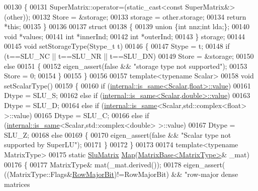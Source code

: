 \begin{DoxyCode}
00130   \{
00131     SuperMatrix::operator=(static\_cast<const SuperMatrix&>(other));
00132     Store = &storage;
00133     storage = other.storage;
00134     \textcolor{keywordflow}{return} *\textcolor{keyword}{this};
00135   \}
00136 
00137   \textcolor{keyword}{struct}
00138   \{
00139     \textcolor{keyword}{union }\{\textcolor{keywordtype}{int} nnz;\textcolor{keywordtype}{int} lda;\};
00140     \textcolor{keywordtype}{void} *values;
00141     \textcolor{keywordtype}{int} *innerInd;
00142     \textcolor{keywordtype}{int} *outerInd;
00143   \} storage;
00144 
00145   \textcolor{keywordtype}{void} setStorageType(Stype\_t t)
00146   \{
00147     Stype = t;
00148     \textcolor{keywordflow}{if} (t==SLU\_NC || t==SLU\_NR || t==SLU\_DN)
00149       Store = &storage;
00150     \textcolor{keywordflow}{else}
00151     \{
00152       eigen\_assert(\textcolor{keyword}{false} && \textcolor{stringliteral}{"storage type not supported"});
00153       Store = 0;
00154     \}
00155   \}
00156 
00157   \textcolor{keyword}{template}<\textcolor{keyword}{typename} Scalar>
00158   \textcolor{keywordtype}{void} setScalarType()
00159   \{
00160     \textcolor{keywordflow}{if} (\hyperlink{struct_eigen_1_1internal_1_1is__same}{internal::is\_same<Scalar,float>::value})
00161       Dtype = SLU\_S;
00162     \textcolor{keywordflow}{else} \textcolor{keywordflow}{if} (\hyperlink{struct_eigen_1_1internal_1_1is__same}{internal::is\_same<Scalar,double>::value})
00163       Dtype = SLU\_D;
00164     \textcolor{keywordflow}{else} \textcolor{keywordflow}{if} (\hyperlink{struct_eigen_1_1internal_1_1is__same}{internal::is\_same}<Scalar,std::complex<float> >::value)
00165       Dtype = SLU\_C;
00166     \textcolor{keywordflow}{else} \textcolor{keywordflow}{if} (\hyperlink{struct_eigen_1_1internal_1_1is__same}{internal::is\_same}<Scalar,std::complex<double> >::value)
00167       Dtype = SLU\_Z;
00168     \textcolor{keywordflow}{else}
00169     \{
00170       eigen\_assert(\textcolor{keyword}{false} && \textcolor{stringliteral}{"Scalar type not supported by SuperLU"});
00171     \}
00172   \}
00173 
00174   \textcolor{keyword}{template}<\textcolor{keyword}{typename} MatrixType>
00175   \textcolor{keyword}{static} \hyperlink{struct_eigen_1_1_slu_matrix}{SluMatrix} \hyperlink{group___core___module_class_eigen_1_1_map}{Map}(\hyperlink{group___core___module_class_eigen_1_1_matrix_base}{MatrixBase<MatrixType>}& \_mat)
00176   \{
00177     MatrixType& mat(\_mat.derived());
00178     eigen\_assert( ((MatrixType::Flags&\hyperlink{group__flags_gae4f56c2a60bbe4bd2e44c5b19cbe8762}{RowMajorBit})!=RowMajorBit) && \textcolor{stringliteral}{"row-major dense matrices
}
\end{DoxyCode}
